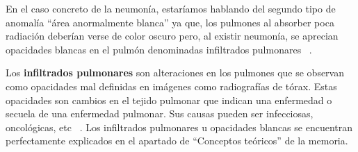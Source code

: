 En el caso concreto de la neumonía, estaríamos hablando del segundo tipo de anomalía ``área anormalmente blanca'' ya que, los pulmones al absorber poca radiación deberían verse de color oscuro pero, al existir neumonía, se aprecian opacidades blancas en el pulmón denominadas infiltrados pulmonares ~\cite{gelaw15}. 

Los \textbf{infiltrados pulmonares} son alteraciones en los pulmones que se observan como opacidades mal definidas en imágenes como radiografías de tórax. Estas opacidades son cambios en el tejido pulmonar que indican una enfermedad o secuela de una enfermedad pulmonar. Sus causas pueden ser infecciosas, oncológicas, etc  ~\cite{Doctoralia24}. Los infiltrados pulmonares u opacidades blancas se encuentran perfectamente explicados en el apartado de ``Conceptos teóricos'' de la memoria.



